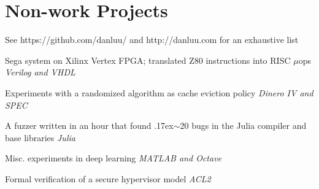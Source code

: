\documentclass[letterpaper]{scrartcl}
\begin{document}
\section*{Non-work Projects}
\begin{list1}
\item
  \begin{list2}
  \item See https://github.com/danluu/ and http://danluu.com for an exhaustive list
    \begin{list3}
    \item Sega system on Xilinx Vertex FPGA; translated Z80 instructions into RISC $\mu$ops \hfill \emph{Verilog and VHDL}
    \item Experiments with a randomized algorithm as cache eviction policy \hfill \emph{Dinero IV and SPEC}
    \item A fuzzer written in an hour that found {\raise.17ex\hbox{$\scriptstyle\mathtt{\sim}$}}20 bugs in the Julia compiler and base libraries \hfill \emph{Julia}
    \item Misc. experiments in deep learning \hfill \emph{MATLAB and Octave}
    \item Formal verification of a secure hypervisor model \hfill \emph{ACL2}
    \end{list3}

  \end{list2}
\end{list1}


%
%
\end{document}
